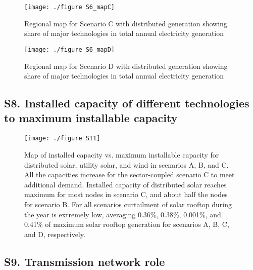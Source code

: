 	\begin{figure}[H]
		\renewcommand*{\thefigure}{S\arabic{figure}}
		
		\texttt{[image: ./figure S6\_mapC]}
		\caption{Regional map for Scenario C with distributed generation showing share of major technologies in total annual electricity generation}
	\end{figure}
	
	\begin{figure}[H]
		\renewcommand*{\thefigure}{S\arabic{figure}}
		
		\texttt{[image: ./figure S6\_mapD]}
		\caption{Regional map for Scenario D with distributed generation showing share of major technologies in total annual electricity generation}
	\end{figure}
	
	\subsection*{S8. Installed capacity of different technologies to maximum installable capacity}
	
	\begin{figure}[H]
		\renewcommand*{\thefigure}{S\arabic{figure}}
		
		\texttt{[image: ./figure S11]}
		\caption{Map of installed capacity vs. maximum installable capacity for distributed solar, utility solar, and wind in scenarios A, B, and C. All the capacities increase for the sector-coupled scenario C to meet additional demand. Installed capacity of distributed solar reaches maximum for most nodes in scenario C, and about half the nodes for scenario B. For all scenarios curtailment of solar rooftop during the year is extremely low, averaging 0.36\%, 0.38\%, 0.001\%, and 0.41\% of maximum solar rooftop generation for scenarios A, B, C, and D, respectively.}
	\end{figure}
	
	\subsection*{S9. Transmission network role}
	
